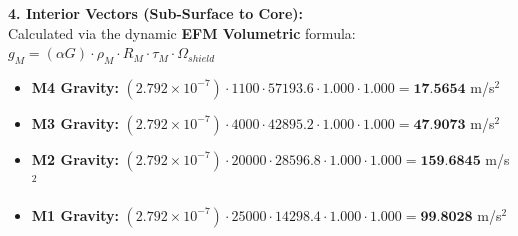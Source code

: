 \documentclass[11pt, a4paper]{article}
\begin{document}
  \vspace{0.5em}
  \noindent \textbf{4. Interior Vectors (Sub-Surface to Core):} \\[0.5em]
  \hspace*{1em} Calculated via the dynamic \textbf{EFM Volumetric} formula: $g_M = (\alpha G) \cdot \rho_{M} \cdot R_M \cdot \tau_M \cdot \Omega_{shield}$
  \begin{itemize}
    \item \textbf{M4 Gravity:} $(2.792 \times 10^{-7}) \cdot 1100 \cdot 57193.6 \cdot 1.000 \cdot 1.000 = \textbf{17.5654}$ m/s$^2$
    \item \textbf{M3 Gravity:} $(2.792 \times 10^{-7}) \cdot 4000 \cdot 42895.2 \cdot 1.000 \cdot 1.000 = \textbf{47.9073}$ m/s$^2$
    \item \textbf{M2 Gravity:} $(2.792 \times 10^{-7}) \cdot 20000 \cdot 28596.8 \cdot 1.000 \cdot 1.000 = \textbf{159.6845}$ m/s$^2$
    \item \textbf{M1 Gravity:} $(2.792 \times 10^{-7}) \cdot 25000 \cdot 14298.4 \cdot 1.000 \cdot 1.000 = \textbf{99.8028}$ m/s$^2$
  \end{itemize}
\end{document}
